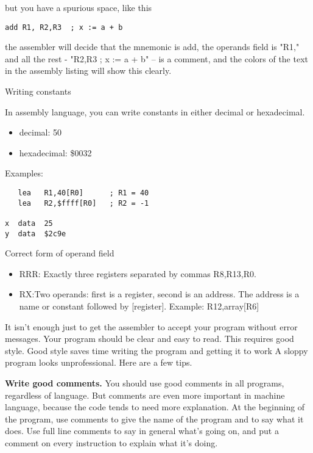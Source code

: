\documentclass[11pt]{article}
\begin{document}
\begin{itemize}
but you have a spurious space, like this

\begin{verbatim}
add R1, R2,R3  ; x := a + b
\end{verbatim}

the assembler will decide that the mnemonic is add, the operands field
is "R1," and all the rest - "R2,R3 ; x := a + b" -- is a comment, and
the colors of the text in the assembly listing will show this clearly.

Writing constants

In assembly language, you can write constants in either decimal
or hexadecimal.

\begin{itemize}
\item decimal:   50
\item hexadecimal: \$0032
\end{itemize}

Examples:

\begin{verbatim}
   lea   R1,40[R0]      ; R1 = 40
   lea   R2,$ffff[R0]   ; R2 = -1

x  data  25
y  data  $2c9e
\end{verbatim}

Correct form of operand field

\begin{itemize}
\item RRR: Exactly three registers separated by commas R8,R13,R0.

\item RX:Two operands: first is a register, second is an address.  The
address is a name or constant followed by [register]. Example:
R12,array[R6]
\end{itemize}




It isn't enough just to get the assembler to accept your program
without error messages.  Your program should be clear and easy to
read.  This requires good style.  Good style saves time writing the
program and getting it to work A sloppy program looks unprofessional.
Here are a few tips.

\textbf{Write good comments.} You should use good comments in all programs,
regardless of language.  But comments are even more important in
machine language, because the code tends to need more explanation.  At
the beginning of the program, use comments to give the name of the
program and to say what it does.  Use full line comments to say in
general what's going on, and put a comment on every instruction to
explain what it's doing.


\end{itemize}
\end{document}
